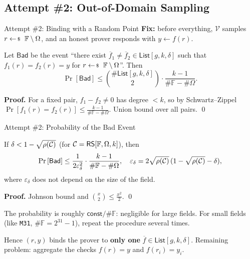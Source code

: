 \documentclass{zkdl-presentation-template}
\begin{document}
    \subsection{Attempt \#2: Out-of-Domain Sampling}

    \begin{frame}{Attempt \#2: Binding with a Random Point}
        \textbf{Fix:} before everything, $\mathcal{V}$ samples $r \leftarrowS \mathbb{F} \setminus \Omega$, and an honest prover responds with $y \gets f(r)$.
        \pause

        \begin{proposition}
            Let $\mathsf{Bad}$ be the event ``there exist $\overline{f}_1 \neq \overline{f}_2 \in \mathsf{List}[g,k,\delta]$ such that $f_1(r) = f_2(r) = y$ for $r \leftarrowS \mathbb{F} \setminus \Omega$''. Then
            \begin{equation*}
                \Pr\left[ \mathsf{Bad} \right] \leq \binom{\#\mathsf{List}[g,k,\delta]}{2} \cdot \frac{k-1}{\#\mathbb{F} - \#\Omega}.
            \end{equation*}
        \end{proposition}
        \pause

        \textbf{Proof.} For a fixed pair, $f_1 - f_2 \neq 0$ has degree $< k$, so by Schwartz--Zippel $\Pr[f_1(r) = f_2(r)] \leq \frac{k-1}{\#\mathbb{F} - \#\Omega}$. Union bound over all pairs. \qed
    \end{frame}

    \begin{frame}{Attempt \#2: Probability of the Bad Event}
        \begin{corollary}
            If $\delta < 1-\sqrt{\rho(\mathcal{C})}$ (for $\mathcal{C}=\mathsf{RS}[\mathbb{F},\Omega,k]$), then
            \begin{equation*}
                \Pr\left[ \mathsf{Bad} \right] \leq \frac{1}{2\varepsilon_{\delta}^2} \cdot \frac{k-1}{\#\mathbb{F} - \#\Omega}, \quad \varepsilon_{\delta} = 2\sqrt{\rho(\mathcal{C})}\,(1-\sqrt{\rho(\mathcal{C})}-\delta),
            \end{equation*}
            where $\varepsilon_{\delta}$ does not depend on the size of the field.
        \end{corollary}
        \textbf{Proof.} Johnson bound and $\binom{x}{2} \leq \frac{x^2}{2}$. \qed
        \pause

        \begin{remark}
            The probability is roughly $\mathsf{const}/\#\mathbb{F}$: negligible for large fields. For small fields (like \texttt{M31}, $\#\mathbb{F} = 2^{31}-1$), repeat the procedure several times.
        \end{remark}
        \pause

        Hence $(r,y)$ binds the prover to \textbf{only one} $\overline{f} \in \mathsf{List}[g,k,\delta]$. Remaining problem: aggregate the checks $f(r)=y$ and $f(r_i)=y_i$.
    \end{frame}
\end{document}
